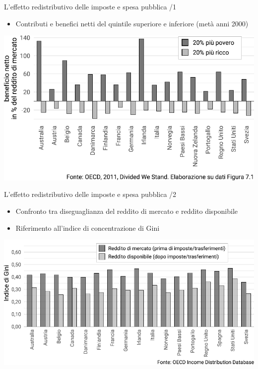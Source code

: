 \documentclass[11pt]{beamer}
\begin{document}
\begin{frame}{L'effetto redistributivo delle imposte e spesa pubblica /1}
\begin{itemize}
\item Contributi e benefici netti del quintile superiore e inferiore (metà anni 2000)
\end{itemize}

\begin{center}
\includegraphics[width=\textwidth]{./figure/effetti-redistributivi-imposte-benefici.pdf}
\end{center}
\end{frame}

\begin{frame}{L'effetto redistributivo delle imposte e spesa pubblica /2}
\begin{itemize}
\item Confronto tra diseguaglianza del reddito di mercato e reddito disponibile
\item Riferimento all'indice di concentrazione di Gini
\end{itemize}

\begin{center}
\includegraphics[width=\textwidth]{./figure/gini-mkt-disp.pdf}
\end{center}
\end{frame}
\end{document}
